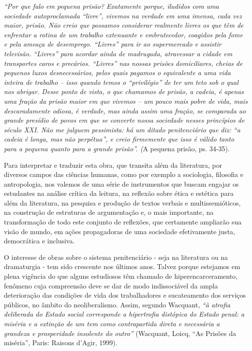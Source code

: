 \documentclass[11pt]{extarticle}
\begin{document}
\emph{``Por que falo em pequena prisão? Exatamente porque, iludidos com
uma sociedade autoproclamada ``livre'', vivemos na verdade em uma
imensa, cada vez maior, prisão. Não creio que possamos considerar
realmente livres os que têm de enfrentar a rotina de um trabalho
extenuante e embrutecedor, coagidos pela fome e pela ameaça de
desemprego. ``Livres'' para ir ao supermercado e assistir televisão.
``Livres'' para acordar ainda de madrugada, atravessar a cidade em
transportes caros e precários. ``Livres'' nas nossas prisões
domiciliares, cheias de pequenos luxos desnecessários, pelos quais
pagamos o equivalente a uma vida inteira de trabalho -- isso quando
temos o ``privilégio'' de ter um teto sob o qual nos abrigar. Desse
ponto de vista, o que chamamos de prisão, a cadeia, é apenas uma fração
da prisão maior em que vivemos -- um pouco mais pobre de vida, mais
descaradamente odiosa, é verdade, mas ainda assim uma fração, se
comparada ao grande presídio de povos em que se converte nossa sociedade
nesses princípios de século XXI. Não me julguem pessimista: há um ditado
penitenciário que diz: ``a cadeia é longa, mas não perpétua'', e creio
firmemente que isso é válido tanto para a pequena quanto para a grande
prisão''. (}A pequena prisão, ps. 34-35).

Para interpretar e traduzir esta obra, que transita além da literatura,
por diversos campos das ciências humanas, como por exemplo a sociologia,
filosofia e antropologia, nos valemos de uma série de instrumentos que
buscam engajar os estudantes na análise crítica da leitura, na reflexão
sobre ética e estética para além da literatura, na pesquisa e produção
de textos verbais e multissemióticos, na construção de estruturas de
argumentação e, o mais importante, na transformação de todo este
conjunto de reflexões, que certamente ampliarão sua visão de mundo, em
ações propagadoras de uma sociedade efetivamente justa, democrática e
inclusiva.

O interesse de obras sobre o sistema penitenciário - seja na literatura
ou na dramaturgia - tem sido crescente nos últimos anos. Talvez porque
estejamos em plena vigência do que alguns estudiosos têm chamado de
hiperencarceramento, fenômeno cuja compreensão deve se dar de modo
indissociável da ampla deterioração das condições de vida dos
trabalhadores e sucateamento dos serviços públicos, no âmbito do
neoliberalismo. Assim, segundo Wacquant, \emph{``à atrofia deliberada do
Estado social corresponde a hipertrofia distópica do Estado penal: a
miséria e a extinção de um tem como contrapartida direta e necessária a
grandeza e prosperidade insolente do outro''} (Wacquant, Loicq, ``As
Prisões da miséria'', Paris: Raisons d'Agir, 1999).
\end{document}
